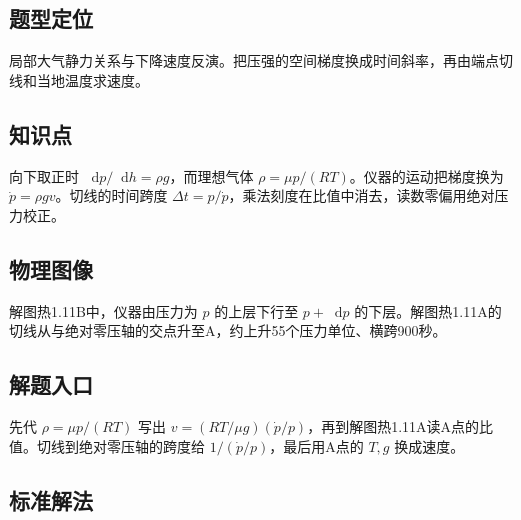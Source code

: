 \documentclass[UTF8,fontset=fandol,a4paper,11pt]{ctexart}
\newcommand{\dd}{\mathop{}\!\mathrm{d}}
\begin{document}


\subsection*{题型定位}

局部大气静力关系与下降速度反演。把压强的空间梯度换成时间斜率，再由端点切线和当地温度求速度。



\subsection*{知识点}

向下取正时 $\dd p/\dd h=\rho g$，而理想气体 $\rho=\mu p/(RT)$。仪器的运动把梯度换为 $\dot p=\rho g v$。切线的时间跨度 $\Delta t=p/\dot p$，乘法刻度在比值中消去，读数零偏用绝对压力校正。



\subsection*{物理图像}

解图热1.11B中，仪器由压力为 $p$ 的上层下行至 $p+\dd p$ 的下层。解图热1.11A的切线从与绝对零压轴的交点升至A，约上升55个压力单位、横跨900秒。



\subsection*{解题入口}

先代 $\rho=\mu p/(RT)$ 写出 $v=(RT/\mu g)(\dot p/p)$，再到解图热1.11A读A点的比值。切线到绝对零压轴的跨度给 $1/(\dot p/p)$，最后用A点的 $T,g$ 换成速度。



\subsection*{标准解法}
\end{document}
